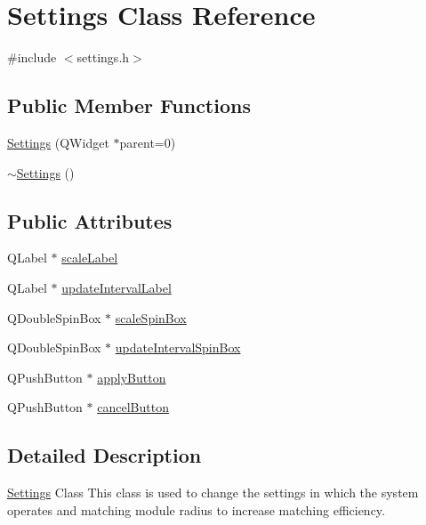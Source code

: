 \hypertarget{classSettings}{
\section{Settings Class Reference}
\label{classSettings}
}


{\ttfamily \#include $<$settings.h$>$}

\subsection*{Public Member Functions}
\begin{DoxyCompactItemize}
\item 
\hyperlink{classSettings_ab17afd334db0af5f71c027b8eda8d514}{Settings} (QWidget $\ast$parent=0)
\item 
\hyperlink{classSettings_a4a65be5921dfc9fddc476e5320541d89}{$\sim$Settings} ()
\end{DoxyCompactItemize}
\subsection*{Public Attributes}
\begin{DoxyCompactItemize}
\item 
QLabel $\ast$ \hyperlink{classSettings_a6b604fade5b78035a964c1b64f868a9e}{scaleLabel}
\item 
QLabel $\ast$ \hyperlink{classSettings_a292d6416ebf86b8e3a58bda7075e4f3e}{updateIntervalLabel}
\item 
QDoubleSpinBox $\ast$ \hyperlink{classSettings_a0e9f71e47a312e06db46fcad5d287d76}{scaleSpinBox}
\item 
QDoubleSpinBox $\ast$ \hyperlink{classSettings_a9bf9ab18da308f29adbd46dbc2302c6c}{updateIntervalSpinBox}
\item 
QPushButton $\ast$ \hyperlink{classSettings_a446dbdae4ee22356337bdd0e9dab6d28}{applyButton}
\item 
QPushButton $\ast$ \hyperlink{classSettings_a0ba00fafc6bd37a3a4fb6cddfe65cfbe}{cancelButton}
\end{DoxyCompactItemize}


\subsection{Detailed Description}
\hyperlink{classSettings}{Settings} Class This class is used to change the settings in which the system operates and matching module radius to increase matching efficiency. 

